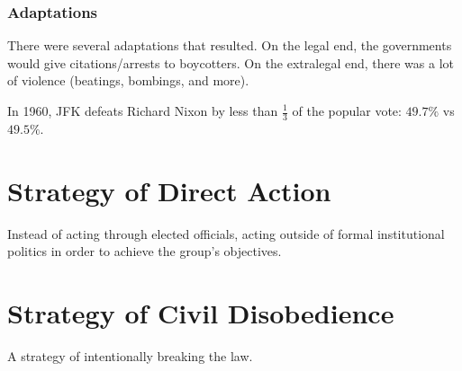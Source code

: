 \subsubsection{Adaptations}
There were several adaptations that resulted.
On the legal end, the governments would give citations/arrests to boycotters.
On the extralegal end, there was a lot of violence (beatings, bombings, and more).


In 1960, JFK defeats Richard Nixon by less than $\frac{1}{3}$ of the popular vote:
$49.7\%$ vs $49.5\%$.

\section{Strategy of Direct Action}
Instead of acting through elected officials, acting outside of formal institutional politics in order to achieve the group's objectives.


\section{Strategy of Civil Disobedience}
A strategy of intentionally breaking the law.
